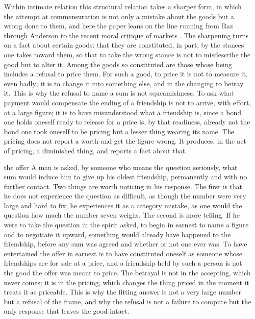 Within intimate relation this structural relation takes a sharper form, in which the attempt at commensuration is not only a mistake about the goods but a wrong done to them, and here the paper leans on the line running from Raz through Anderson to the recent moral critique of markets \parencite{anderson1993value,sandel2012money}. The sharpening turns on a fact about certain goods: that they are constituted, in part, by the stances one takes toward them, so that to take the wrong stance is not to misdescribe the good but to alter it. Among the goods so constituted are those whose being includes a refusal to price them. For such a good, to price it is not to measure it, even badly; it is to change it into something else, and in the changing to betray it. This is why the refusal to name a sum is not squeamishness. To ask what payment would compensate the ending of a friendship is not to arrive, with effort, at a large figure; it is to have misunderstood what a friendship is, since a bond one holds oneself ready to release for a price is, by that readiness, already not the bond one took oneself to be pricing but a lesser thing wearing its name. The pricing does not report a worth and get the figure wrong. It produces, in the act of pricing, a diminished thing, and reports a fact about that.

\begin{casebox}{the offer}
A man is asked, by someone who means the question seriously, what sum would induce him to give up his oldest friendship, permanently and with no further contact. Two things are worth noticing in his response. The first is that he does not experience the question as difficult, as though the number were very large and hard to fix; he experiences it as a category mistake, as one would the question how much the number seven weighs. The second is more telling. If he were to take the question in the spirit asked, to begin in earnest to name a figure and to negotiate it upward, something would already have happened to the friendship, before any sum was agreed and whether or not one ever was. To have entertained the offer in earnest is to have constituted oneself as someone whose friendships are for sale at a price, and a friendship held by such a person is not the good the offer was meant to price. The betrayal is not in the accepting, which never comes; it is in the pricing, which changes the thing priced in the moment it treats it as priceable. This is why the fitting answer is not a very large number but a refusal of the frame, and why the refusal is not a failure to compute but the only response that leaves the good intact.
\end{casebox}


